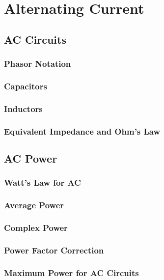 \documentclass[a4paper,11pt]{book}
\begin{document}
\part{Alternating Current}

\chapter{AC Circuits}

\section{Phasor Notation}

\section{Capacitors}

\section{Inductors}

\section{Equivalent Impedance and Ohm's Law}

\chapter{AC Power}
\section{Watt's Law for AC}

\section{Average Power}

\section{Complex Power}

\section{Power Factor Correction}

\section{Maximum Power for AC Circuits}

\end{document}
